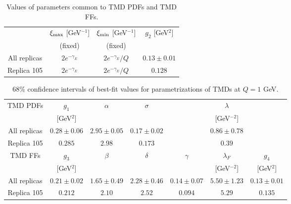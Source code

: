\documentclass[aps,preprintnumbers,showpacs,nofootinbib,superscriptaddress,floatfix]{revtex4}
\newcommand{\bb}{\xi}
\begin{document}
\begin{table}[h!]
\small
  \centering
  \begin{tabular}{|c|c|c|c|}
\hline
\hline
&$\bb_{\rm max}$ [GeV$^{-1}$] & $\bb_{\rm min}$ [GeV$^{-1}$] &  $g_2$ {[GeV$^2$]} 
 \\ 
& (fixed)     & (fixed)   &                            \\
\hline
All replicas & $2 e^{-\gamma_E}$& $2 e^{-\gamma_E}/Q$  & $0.13 \pm 0.01$  \\
\hline
Replica 105 &  $2 e^{-\gamma_E}$& $2 e^{-\gamma_E}/Q$  & $0.128$  \\
\hline
\hline
\end{tabular}
\caption{Values of parameters common to TMD PDFs and TMD FFs.}
\label{t:fl_ind_parcommon}
\end{table}
\begin{table}[h!]
\small
  \centering
  \begin{tabular}{|c||c|c|c|c|c|c|}
\hline
\hline
TMD PDFs&  $g_1$ 
& $\alpha$ & $\sigma$ & & $\lambda$ &  
 \\ 
        & {[GeV$^2$]}                               &
       &      &  &{[GeV$^{-2}$]} & \\
\hline
All replicas &  $0.28\pm 0.06$ & $2.95\pm 0.05$ & $0.17\pm 0.02$ & 
                & $0.86\pm 0.78$ & 
\\
\hline
Replica 105  &  $0.285$ & $2.98$ & $0.173$ & & $0.39$ & \\
\hline
\hline
TMD FFs&  $g_3$ &
$\beta$ & $\delta$ & $\gamma$ & $\lambda_F$ & $g_4$
 \\ 
        & {[GeV$^2$]} &            &        & &{[GeV$^{-2}$]} &{[GeV$^2$]}    \\
\hline
All replicas & $0.21\pm 0.02$ & $1.65\pm 0.49$ & $2.28\pm 0.46$ & $0.14\pm 0.07$ &
$5.50\pm 1.23$ & $0.13\pm 0.01$ \\
\hline
Replica 105   &  
 $0.212$ & $2.10$ & $2.52$ & $0.094$ & $5.29$ & $0.135$ \\
\hline
\hline
\end{tabular}
\caption{68\% confidence intervals of best-fit values for parametrizations of TMDs at $Q=1$ GeV.}
\label{t:fl_ind_par_TMD}
\end{table}
\end{document}

